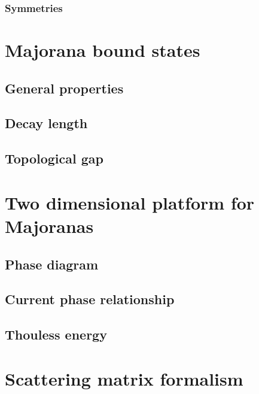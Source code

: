 			\subsubsection{Symmetries}


\section{Majorana bound states}
	\subsection{General properties}
	\subsection{Decay length}
	\subsection{Topological gap}

\section{Two dimensional platform for Majoranas}
	\subsection{Phase diagram}
	\subsection{Current phase relationship}
	\subsection{Thouless energy}

\section{Scattering matrix formalism}

